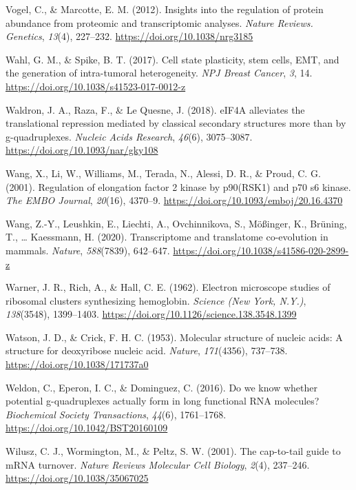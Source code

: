 \documentclass[12pt,openany]{book}
\begin{document}
\hypertarget{ref-Vogel2012}{}
Vogel, C., \& Marcotte, E. M. (2012). Insights into the regulation of
protein abundance from proteomic and transcriptomic analyses.
\emph{Nature Reviews. Genetics}, \emph{13}(4), 227--232.
\url{https://doi.org/10.1038/nrg3185}

\hypertarget{ref-Wahl2017}{}
Wahl, G. M., \& Spike, B. T. (2017). Cell state plasticity, stem cells,
EMT, and the generation of intra-tumoral heterogeneity. \emph{NPJ Breast
Cancer}, \emph{3}, 14. \url{https://doi.org/10.1038/s41523-017-0012-z}

\hypertarget{ref-Waldron2018}{}
Waldron, J. A., Raza, F., \& Le Quesne, J. (2018). eIF4A alleviates the
translational repression mediated by classical secondary structures more
than by g-quadruplexes. \emph{Nucleic Acids Research}, \emph{46}(6),
3075--3087. \url{https://doi.org/10.1093/nar/gky108}

\hypertarget{ref-Wang2001}{}
Wang, X., Li, W., Williams, M., Terada, N., Alessi, D. R., \& Proud, C.
G. (2001). Regulation of elongation factor 2 kinase by p90(RSK1) and p70
s6 kinase. \emph{The EMBO Journal}, \emph{20}(16), 4370--9.
\url{https://doi.org/10.1093/emboj/20.16.4370}

\hypertarget{ref-Wang2020}{}
Wang, Z.-Y., Leushkin, E., Liechti, A., Ovchinnikova, S., Mößinger, K.,
Brüning, T., \ldots{} Kaessmann, H. (2020). Transcriptome and
translatome co-evolution in mammals. \emph{Nature}, \emph{588}(7839),
642--647. \url{https://doi.org/10.1038/s41586-020-2899-z}

\hypertarget{ref-Warner1962}{}
Warner, J. R., Rich, A., \& Hall, C. E. (1962). Electron microscope
studies of ribosomal clusters synthesizing hemoglobin. \emph{Science
(New York, N.Y.)}, \emph{138}(3548), 1399--1403.
\url{https://doi.org/10.1126/science.138.3548.1399}

\hypertarget{ref-Watson1953}{}
Watson, J. D., \& Crick, F. H. C. (1953). Molecular structure of nucleic
acids: A structure for deoxyribose nucleic acid. \emph{Nature},
\emph{171}(4356), 737--738. \url{https://doi.org/10.1038/171737a0}

\hypertarget{ref-Weldon2016}{}
Weldon, C., Eperon, I. C., \& Dominguez, C. (2016). Do we know whether
potential g-quadruplexes actually form in long functional RNA molecules?
\emph{Biochemical Society Transactions}, \emph{44}(6), 1761--1768.
\url{https://doi.org/10.1042/BST20160109}

\hypertarget{ref-Wilusz2001}{}
Wilusz, C. J., Wormington, M., \& Peltz, S. W. (2001). The cap-to-tail
guide to mRNA turnover. \emph{Nature Reviews Molecular Cell Biology},
\emph{2}(4), 237--246. \url{https://doi.org/10.1038/35067025}
\end{document}
